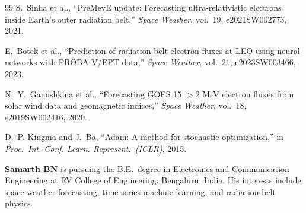 \documentclass{ieeeaccess}
\begin{document}
\begin{thebibliography}{99}
S.~Sinha et al., ``PreMevE update: Forecasting ultra-relativistic electrons
inside Earth's outer radiation belt,'' \emph{Space Weather}, vol.~19,
e2021SW002773, 2021.


E.~Botek et al., ``Prediction of radiation belt electron fluxes at LEO using
neural networks with PROBA-V/EPT data,'' \emph{Space Weather}, vol.~21,
e2023SW003466, 2023.

N.~Y.~Ganushkina et al., ``Forecasting GOES 15 \(>2\) MeV electron fluxes from
solar wind data and geomagnetic indices,'' \emph{Space Weather}, vol.~18,
e2019SW002416, 2020.

D.~P. Kingma and J.~Ba, ``Adam: A method for stochastic optimization,''
in \emph{Proc.\ Int. Conf. Learn. Represent.\ (ICLR)}, 2015.




\end{thebibliography}

\vspace{3ex}
\noindent\textbf{Samarth BN} is pursuing the B.E.\ degree in Electronics and
Communication Engineering at RV College of Engineering, Bengaluru, India.
His interests include space-weather forecasting, time-series machine learning,
and radiation-belt physics.

\EOD
\end{document}
